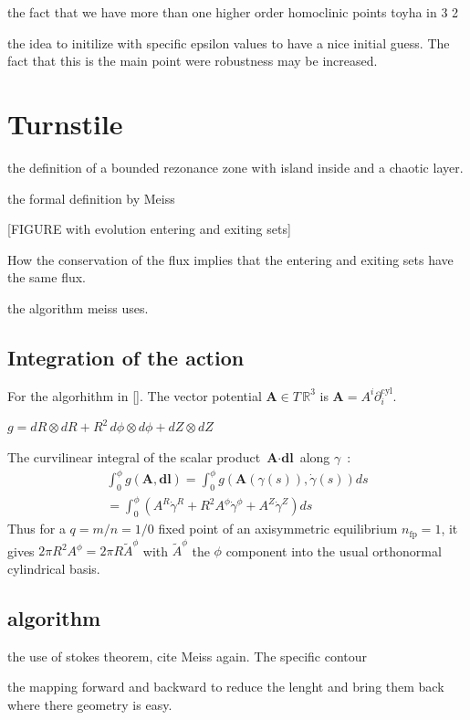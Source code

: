 the fact that we have more than one
higher order homoclinic points
toyha in 3 2 

the idea to initilize with specific epsilon values to have a nice initial guess. The fact that this is the main point were robustness may be increased.

\section{Turnstile}

the definition of a bounded rezonance zone with island inside and a chaotic layer.

the formal definition by Meiss

[FIGURE with evolution entering and exiting sets]

How the conservation of the flux implies that the entering and exiting sets have the same flux.

the algorithm meiss uses.

\subsection{Integration of the action}

For the algorhithm in []. The vector potential $\textbf{A} \in T\,\mathbb{R}^3$ is $\textbf{A} =  A^i\partial_i^\text{cyl}$.

$g = dR\otimes dR + R^2\,d\phi\otimes d\phi + dZ\otimes dZ$

The curvilinear integral of the scalar product $\textbf{A}\cdot\textbf{dl}$ along $\gamma$~:
\begin{align*}
    \int_0^\phi g(\textbf{A},\textbf{dl}) = \int_0^\phi g(\textbf{A}(\gamma(s)),\dot{\gamma}(s))ds\\ = \int_0^\phi (A^R\dot{\gamma}^R + R^2A^\phi\dot{\gamma}^\phi + A^Z\dot{\gamma}^Z) ds
\end{align*}
Thus for a $q=m/n=1/0$ fixed point of an axisymmetric equilibrium $n_\text{fp} = 1$, it gives $2\pi R^2A^\phi = 2\pi R\tilde{A}^\phi$ with $\tilde{A}^\phi$ the $\phi$ component into the usual orthonormal cylindrical basis.

\subsection{algorithm}

the use of stokes theorem, cite Meiss again.
The specific contour

the mapping forward and backward to reduce the lenght and bring them back where there geometry is easy.

